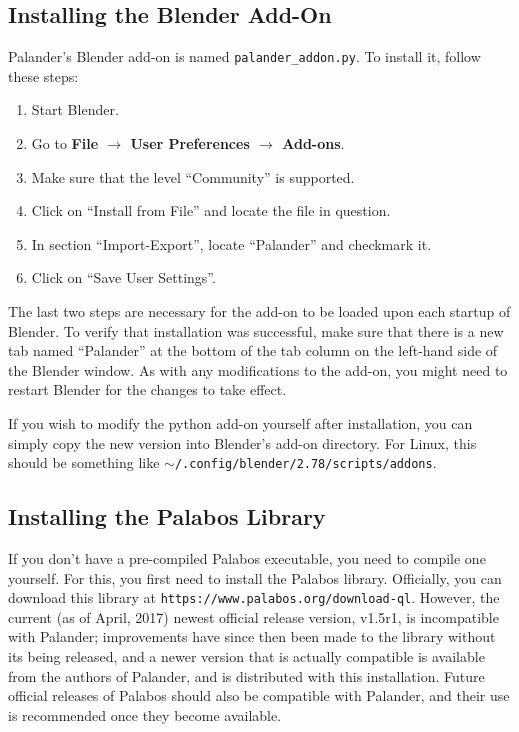 \documentclass[12pt]{article}
\begin{document}
\subsection{Installing the Blender Add-On}

Palander's Blender add-on is named \verb|palander_addon.py|. To install it, follow these steps:
\begin{enumerate}
\item Start Blender.
\item Go to {\bf File $\to$ User Preferences $\to$ Add-ons}.
\item Make sure that the level ``Community'' is supported.
\item Click on ``Install from File'' and locate the file in question.
\item In section ``Import-Export'', locate ``Palander'' and checkmark it.
\item Click on ``Save User Settings''.
\end{enumerate}
The last two steps are necessary for the add-on to be loaded upon each startup of Blender. To verify that 
installation was successful, make sure that there is a new tab named ``Palander'' at the bottom of the tab 
column on the left-hand side of the Blender window. As with any modifications to the add-on, you might need 
to restart Blender for the changes to take effect.

If you wish to modify the python add-on yourself after installation, you can simply copy the new version into 
Blender's add-on directory. For Linux, this should be something like 
$\sim$\verb|/.config/blender/2.78/scripts/addons|.

\subsection{Installing the Palabos Library} \label{install_lib}

If you don't have a pre-compiled Palabos executable, you need to compile one yourself. For this, you first 
need to install the Palabos library. Officially, you can download this library at 
\verb|https://www.palabos.org/download-ql|. However, the current (as of April, 2017) newest official release 
version, v1.5r1, is incompatible with Palander; improvements have since then been made to the library without 
its being released, and a newer version that is actually compatible is available from the authors of 
Palander, and is distributed with this installation. Future official releases of Palabos should also be 
compatible with Palander, and their use is recommended once they become available.
\end{document}
